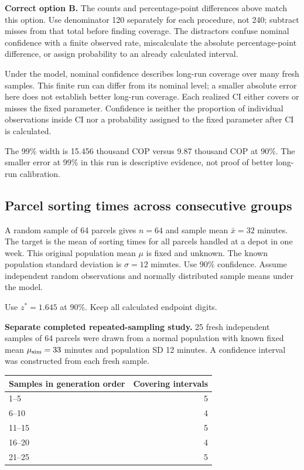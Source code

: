 \textbf{Correct option B.} The counts and percentage-point differences above match this option. Use denominator 120 separately for each procedure, not 240; subtract misses from that total before finding coverage. The distractors confuse nominal confidence with a finite observed rate, miscalculate the absolute percentage-point difference, or assign probability to an already calculated interval.

Under the model, nominal confidence describes long-run coverage over many fresh samples. This finite run can differ from its nominal level; a smaller absolute error here does not establish better long-run coverage. Each realized $\mathrm{CI}$ either covers or misses the fixed parameter. Confidence is neither the proportion of individual observations inside $\mathrm{CI}$ nor a probability assigned to the fixed parameter after $\mathrm{CI}$ is calculated.

The 99\% width is 15.456 thousand COP versus 9.87 thousand COP at 90\%. The smaller error at 99\% in this run is descriptive evidence, not proof of better long-run calibration.
\par\nopagebreak[4]
\par\vspace{3mm}
\clearpage
\subsection{Parcel sorting times across consecutive groups}
\label{prob:c2-advanced-c}

A random sample of 64 parcels gives $n=64$ and sample mean $\bar{x}=32$ minutes. The target is the mean of sorting times for all parcels handled at a depot in one week. This original population mean $\mu$ is fixed and unknown. The known population standard deviation is $\sigma=12$ minutes. Use 90\% confidence. Assume independent random observations and normally distributed sample means under the model.

Use $z^*=1.645$ at 90\%. Keep all calculated endpoint digits.

\textbf{Separate completed repeated-sampling study.} 25 fresh independent samples of 64 parcels were drawn from a normal population with known fixed mean $\mu_{\rm sim}=33$ minutes and population SD 12 minutes. A confidence interval was constructed from each fresh sample.
\begin{center}\begin{tabular}{@{}lr@{}}\toprule
Samples in generation order & Covering intervals\\\midrule
1--5 & 5 \\[6pt]
6--10 & 4 \\[6pt]
11--15 & 5 \\[6pt]
16--20 & 4 \\[6pt]
21--25 & 5 \\[6pt]
\bottomrule\end{tabular}\end{center}


